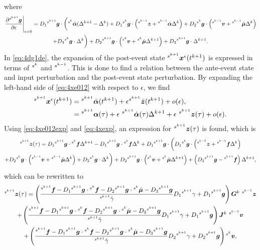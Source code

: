 \documentclass[../DC2017114Bouma.tex]{subfiles}
\begin{document}
where
\begin{multline}
\left.\frac{\partial\hspace{0cm}^{s^{k+1}}{\boldsymbol{g}}}{\partial\epsilon}\right|_{\epsilon=0} = D_1\hspace{0cm}^{s^{k+1}}{\boldsymbol{g}}\cdot\bigg(\hspace{0cm}^{s^k}\dot{\boldsymbol{\alpha}}(\Delta^{k+1}-\Delta^{k}) + D_1\hspace{0cm}^{s^k}{\boldsymbol{g}}\cdot\left(\hspace{0cm}^{s^{k-1}}{\boldsymbol{z}}+\hspace{0cm}^{s^{k-1}}\dot{\boldsymbol{\alpha}}\Delta^{k}\right) + D_2\hspace{0cm}^{s^k}{\boldsymbol{g}}\cdot\left(\hspace{0cm}^{s^{k-1}}{\boldsymbol{v}}+\hspace{0cm}^{s^{k-1}}\dot{\boldsymbol{\mu}}\Delta^{k}\right) \\ + D_3\hspace{0cm}^{s^k}{\boldsymbol{g}}\cdot\Delta^{k} \bigg)+ D_2 \hspace{0cm}^{s^{k+1}}{\boldsymbol{g}}\cdot\left(\hspace{0cm}^{s^{k}}{\boldsymbol{v}}+\hspace{0cm}^{s^{k}}\dot{\boldsymbol{\mu}}\Delta^{k+1} \right) + D_3\hspace{0cm}^{s^{k+1}}{\boldsymbol{g}}\cdot\Delta^{k+1}. \label{eq:4dg1de}
\end{multline}
In \eqref{eq:4dg1de}, the expansion of the post-event state $\hspace{0cm}^{s^{k+1}}{\boldsymbol{x}}^\epsilon(t^{k+1})$ is expressed in terms of $\hspace{0cm}^{s^{k}}$ and $\hspace{0cm}^{s^{k-1}}$. This is done to find a relation between the ante-event state and input perturbation and the post-event state perturbation. By expanding the left-hand side of \eqref{eq:4xe012} with respect to $\epsilon$, we find
\begin{align}
\ls^{s^{k+1}}\xb^\epsilon(t^{k+1}) &= \ls^{s^{k+1}}\bar{\alphab}(t^{k+1})+\epsilon\ls^{s^{k+1}}\bar{\zb}(t^{k+1}) + o(\epsilon),\\
&= \ls^{s^{k+1}}\alphab(\tau) + \epsilon\ ^{s^{k+1}}\dot{\alphab}(\tau)\Delta^{k+1} + \epsilon\ ^{s^{k+1}}\zb(\tau) + o(\epsilon).\label{eq:4xexp}
\end{align}
Using \eqref{eq:4xe012exp} and \eqref{eq:4xexp}, an expression for $\hspace{0cm}^{s^{k+1}}{\boldsymbol{z}}(\tau)$ is found, which is
\begin{multline}
\hspace{0cm}^{s^{k+1}}{\boldsymbol{z}}(\tau) = D_1\hspace{0cm}^{s^{k+1}}{\boldsymbol{g}}\cdot\hspace{0cm}^{s^{k}}{\boldsymbol{f}}\Delta^{k+1} - D_1\hspace{0cm}^{s^{k+1}}{\boldsymbol{g}}\cdot\hspace{0cm}^{s^{k}}{\boldsymbol{f}}\Delta^{k} + D_1\hspace{0cm}^{s^{k+1}}{\boldsymbol{g}}\cdot \bigg( D_1\hspace{0cm}^{s^{k}}{\boldsymbol{g}}\cdot\left(\hspace{0cm}^{s^{k-1}}{\boldsymbol{z}}+\hspace{0cm}^{s^{k-1}}{\boldsymbol{f}}\Delta^{k}\right)\\
+D_2\hspace{0cm}^{s^{k}}{\boldsymbol{g}}\cdot\left(\hspace{0cm}^{s^{k-1}}{\boldsymbol{v}}+\hspace{0cm}^{s^{k-1}}\dot{\boldsymbol{\mu}}\Delta^{k}\right)+D_3\hspace{0cm}^{s^{k}}{\boldsymbol{g}}\cdot\Delta^{k}\bigg) + D_2 \hspace{0cm}^{s^{k+1}}{\boldsymbol{g}}\cdot\left(\hspace{0cm}^{s^{k}}{\boldsymbol{v}}+\hspace{0cm}^{s^{k}}\dot{\boldsymbol{\mu}}\Delta^{k+1} \right) + \left(D_3\hspace{0cm}^{s^{k+1}}{\boldsymbol{g}} - \hspace{0cm}^{s^{k+1}}{\boldsymbol{f}}\right)\Delta^{k+1},\label{eq:4ztau}
\end{multline}
which can be rewritten to 
\begin{multline}
\hspace{0cm}^{s^{k+1}}{\boldsymbol{z}}(\tau) = \left(\frac{\hspace{0cm}^{s^{k+1}}{\boldsymbol{f}} - D_1\hspace{0cm}^{s^{k+1}}{\boldsymbol{g}}\cdot\hspace{0cm}^{s^{k}}{\boldsymbol{f}}  - D_2\hspace{0cm}^{s^{k+1}}{\boldsymbol{g}}\cdot\hspace{0cm}^{s^{k}}\dot{\boldsymbol{\mu}} - D_3\hspace{0cm}^{s^{k+1}}{\boldsymbol{g}}}{\hspace{0cm}^{s^{k+1}}\dot{\gamma}}D_1\hspace{0cm}^{s^{k+1}}\gamma + D_1\hspace{0cm}^{s^{k+1}}{\boldsymbol{g}}\right){\boldsymbol{G}}^{k}\ ^{s^{k-1}}{\boldsymbol{z}}\\
+ \left(\frac{\hspace{0cm}^{s^{k+1}}{\boldsymbol{f}} - D_1\hspace{0cm}^{s^{k+1}}{\boldsymbol{g}}\cdot\hspace{0cm}^{s^{k}}{\boldsymbol{f}} - D_2\hspace{0cm}^{s^{k+1}}{\boldsymbol{g}}\cdot\hspace{0cm}^{s^{k}}\dot{\boldsymbol{\mu}} - D_3\hspace{0cm}^{s^{k+1}}{\boldsymbol{g}}}{\hspace{0cm}^{s^{k+1}}\dot{\gamma}}D_1\hspace{0cm}^{s^{k+1}}\gamma + D_1\hspace{0cm}^{s^{k+1}}{\boldsymbol{g}}\right){\boldsymbol{J}}^{k}\ ^{s^{k-1}}{\boldsymbol{v}}\\
+ \left(\frac{\hspace{0cm}^{s^{k+1}}{\boldsymbol{f}}-D_1\hspace{0cm}^{s^{k+1}}{\boldsymbol{g}}\cdot\hspace{0cm}^{s^{k}}{\boldsymbol{f}} - D_2\hspace{0cm}^{s^{k+1}}{\boldsymbol{g}}\cdot\hspace{0cm}^{s^{k}}\dot{\boldsymbol{\mu}} - D_3\hspace{0cm}^{s^{k+1}}{\boldsymbol{g}}}{\hspace{0cm}^{s^{k+1}}\dot{\gamma}}D_2\hspace{0cm}^{s^{k+1}}\gamma + D_2\hspace{0cm}^{s^{k+1}}{\boldsymbol{g}}\right)\hspace{0cm}^{s^{k}}{\boldsymbol{v}},
\end{multline}
\end{document}
